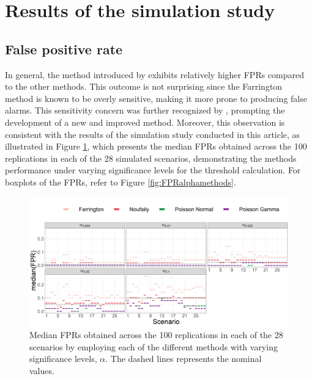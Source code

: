 \documentclass[preprint, 3p, authoryear]{elsarticle} %
\begin{document}
\hypertarget{results-of-the-simulation-study}{%
\section{Results of the simulation study}\label{results-of-the-simulation-study}}

\hypertarget{false-positive-rate}{%
\subsection{False positive rate}\label{false-positive-rate}}

In general, the method introduced by \citet{Farrington_1996} exhibits relatively higher FPRs compared to the other methods. This outcome is not surprising since the Farrington method is known to be overly sensitive, making it more prone to producing false alarms. This sensitivity concern was further recognized by \citet{Noufaily_2013}, prompting the development of a new and improved method. Moreover, this observation is consistent with the results of the simulation study conducted in this article, as illustrated in Figure \ref{fig:FPRalphamethodsmedian}, which presents the median FPRs obtained across the 100 replications in each of the 28 simulated scenarios, demonstrating the methods performance under varying significance levels for the threshold calculation. For boxplots of the FPRs, refer to Figure \ref{fig:FPRalphamethods}.



\begin{figure}[H]
\includegraphics[width=1\linewidth]{../../figures/FPR_alpha_methods_median} \caption{Median FPRs obtained across the 100 replications in each of the 28 scenarios by employing each of the different methods with varying significance levels, \(\alpha\). The dashed lines represents the nominal values.}\label{fig:FPRalphamethodsmedian}
\end{figure}
\end{document}
